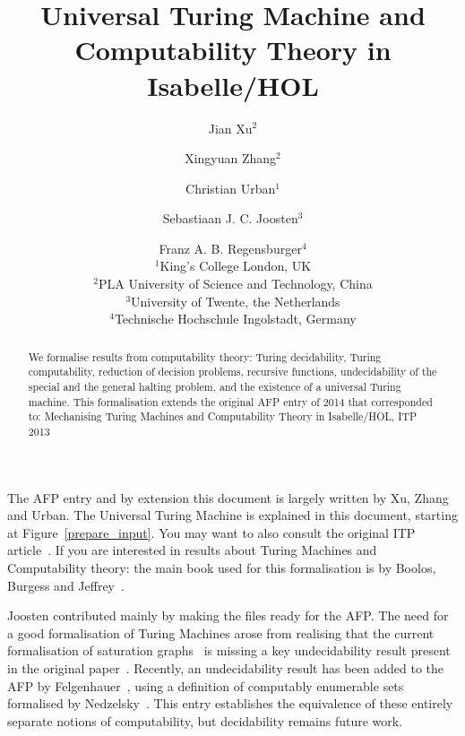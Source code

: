 \documentclass{report}
\def\inst#1{\unskip$^{#1}$}
\begin{document}
\title{Universal Turing Machine and Computability Theory in Isabelle/HOL}
\author{Jian Xu\inst{2} \and Xingyuan Zhang\inst{2} \and Christian Urban\inst{1}
 \and Sebastiaan J. C. Joosten\inst{3}
 \and Franz A. B. Regensburger\inst{4} \vspace{3pt} \\
\inst{1}King's College London, UK \\
\inst{2}PLA University of Science and Technology, China \\
\inst{3}University of Twente, the Netherlands \\
\inst{4}Technische Hochschule Ingolstadt, Germany}

\maketitle

\begin{abstract}
We formalise results from computability theory: Turing decidability, Turing
  computability, reduction of decision problems, recursive functions,
  undecidability of the special and the general halting problem, and the
  existence of a universal Turing machine.  This formalisation extends the
  original AFP entry of 2014 that corresponded to: Mechanising Turing Machines
  and Computability Theory in Isabelle/HOL, ITP 2013
\end{abstract}

The AFP entry and by extension this document is largely written by Xu,
Zhang and Urban.  The Universal Turing Machine is 
explained in this document, starting at Figure~\ref{prepare_input}.
You may want to also consult the original ITP article~\cite{Xu13}.
If you are interested in results about Turing Machines and Computability
theory: the main book used for this formalisation is by Boolos, Burgess
and Jeffrey~\cite{Boolos07}.

Joosten contributed mainly by making the files ready for the AFP.  The
need for a good formalisation of Turing Machines arose from realising
that the current formalisation of saturation
graphs~\cite{Graph_Saturation-AFP} is missing a key undecidability
result present in the original paper~\cite{Joosten18}.  Recently, an
undecidability result has been added to the AFP by
Felgenhauer~\cite{Minsky_Machines-AFP}, using a definition of
computably enumerable sets formalised by
Nedzelsky~\cite{Recursion-Theory-I-AFP}.  This entry establishes the
equivalence of these entirely separate notions of computability, but
decidability remains future work.
\end{document}
